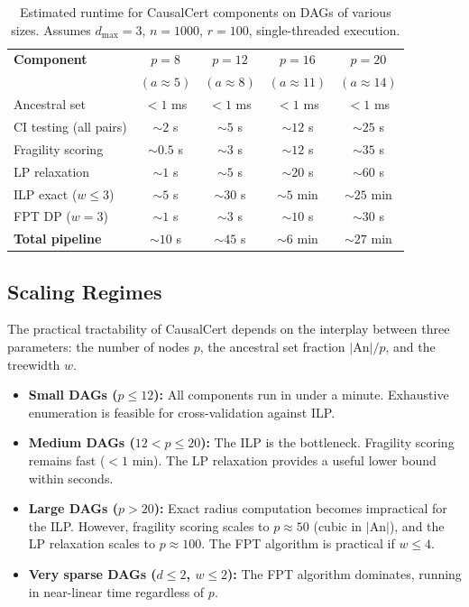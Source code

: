 \documentclass[11pt,a4paper]{article}
\theoremstyle{definition}
\theoremstyle{remark}
\newcommand{\An}{\mathrm{An}}
\begin{document}
\begin{table}[h]
\centering
\caption{Estimated runtime for CausalCert components on DAGs of various sizes.
Assumes $d_{\max} = 3$, $n = 1000$, $r = 100$, single-threaded execution.}
\label{tab:practical}
\begin{tabular}{@{}lcccc@{}}
\toprule
\textbf{Component} & $p = 8$ & $p = 12$ & $p = 16$ & $p = 20$ \\
 & $(a \approx 5)$ & $(a \approx 8)$ & $(a \approx 11)$ & $(a \approx 14)$ \\
\midrule
Ancestral set & $< 1$ ms & $< 1$ ms & $< 1$ ms & $< 1$ ms \\
CI testing (all pairs) & $\sim 2$ s & $\sim 5$ s & $\sim 12$ s & $\sim 25$ s \\
Fragility scoring & $\sim 0.5$ s & $\sim 3$ s & $\sim 12$ s & $\sim 35$ s \\
LP relaxation & $\sim 1$ s & $\sim 5$ s & $\sim 20$ s & $\sim 60$ s \\
ILP exact ($w \leq 3$) & $\sim 5$ s & $\sim 30$ s & $\sim 5$ min & $\sim 25$ min \\
FPT DP ($w = 3$) & $\sim 1$ s & $\sim 3$ s & $\sim 10$ s & $\sim 30$ s \\
\midrule
\textbf{Total pipeline} & $\sim 10$ s & $\sim 45$ s & $\sim 6$ min & $\sim 27$ min \\
\bottomrule
\end{tabular}
\end{table}

\subsection{Scaling Regimes}

The practical tractability of CausalCert depends on the interplay between three
parameters: the number of nodes $p$, the ancestral set fraction $|\An|/p$, and the
treewidth $w$.

\begin{itemize}
\item \textbf{Small DAGs ($p \leq 12$):} All components run in under a minute.
  Exhaustive enumeration is feasible for cross-validation against ILP.

\item \textbf{Medium DAGs ($12 < p \leq 20$):} The ILP is the bottleneck.
  Fragility scoring remains fast ($< 1$ min). The LP relaxation provides a useful
  lower bound within seconds.

\item \textbf{Large DAGs ($p > 20$):} Exact radius computation becomes impractical
  for the ILP. However, fragility scoring scales to $p \approx 50$ (cubic in $|\An|$),
  and the LP relaxation scales to $p \approx 100$. The FPT algorithm is practical
  if $w \leq 4$.

\item \textbf{Very sparse DAGs ($d \leq 2$, $w \leq 2$):} The FPT algorithm
  dominates, running in near-linear time regardless of $p$.
\end{itemize}
\end{document}
